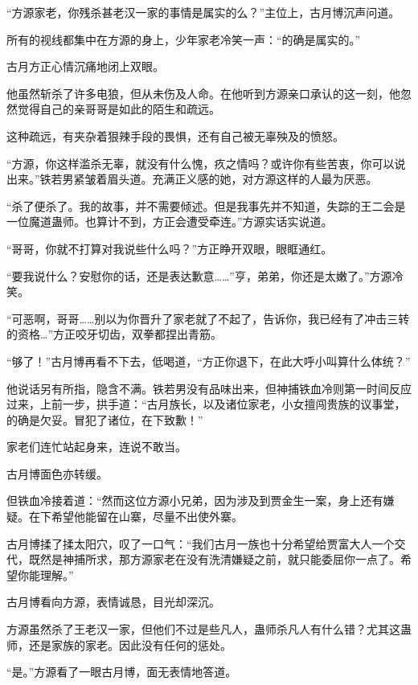 
\begin{this_body}

“方源家老，你残杀甚老汉一家的事情是属实的么？”主位上，古月博沉声问道。

所有的视线都集中在方源的身上，少年家老冷笑一声：“的确是属实的。”

古月方正心情沉痛地闭上双眼。

他虽然斩杀了许多电狼，但从未伤及人命。在他听到方源亲口承认的这一刻，他忽然觉得自己的亲哥哥是如此的陌生和疏远。

这种疏远，有夹杂着狠辣手段的畏惧，还有自己被无辜殃及的愤怒。

“方源，你这样滥杀无辜，就没有什么愧，疚之情吗？或许你有些苦衷，你可以说出来。”铁若男紧皱着眉头道。充满正义感的她，对方源这样的人最为厌恶。

“杀了便杀了。我的故事，并不需要倾述。但是我事先并不知道，失踪的王二会是一位魔道蛊师。也算计不到，方正会遭受牵连。”方源实话实说道。

“哥哥，你就不打算对我说些什么吗？”方正睁开双眼，眼眶通红。

“要我说什么？安慰你的话，还是表达歉意……”亨，弟弟，你还是太嫩了。”方源冷笑。

“可恶啊，哥哥……别以为你晋升了家老就了不起了，告诉你，我已经有了冲击三转的资格…”方正咬牙切齿，双拳都捏出青筋。

“够了！”古月博再看不下去，低喝道，“方正你退下，在此大呼小叫算什么体统？”

他说话另有所指，隐含不满。铁若男没有品味出来，但神捕铁血冷则第一时间反应过来，上前一步，拱手道：“古月族长，以及诸位家老，小女擅闯贵族的议事堂，的确是欠妥。冒犯了诸位，在下致歉！”

家老们连忙站起身来，连说不敢当。

古月博面色亦转缓。

但铁血冷接着道：“然而这位方源小兄弟，因为涉及到贾金生一案，身上还有嫌疑。在下希望他能留在山寨，尽量不出使外寨。

古月博揉了揉太阳穴，叹了一口气：“我们古月一族也十分希望给贾富大人一个交代，既然是神捕所求，那方源家老在没有洗清嫌疑之前，就只能委屈你一点了。希望你能理解。”

古月博看向方源，表情诚恳，目光却深沉。

方源虽然杀了王老汉一家，但他们不过是些凡人，蛊师杀凡人有什么错？尤其这蛊师，还是家族的家老。因此没有任何的惩处。

“是。”方源看了一眼古月博，面无表情地答道。


\end{this_body}
